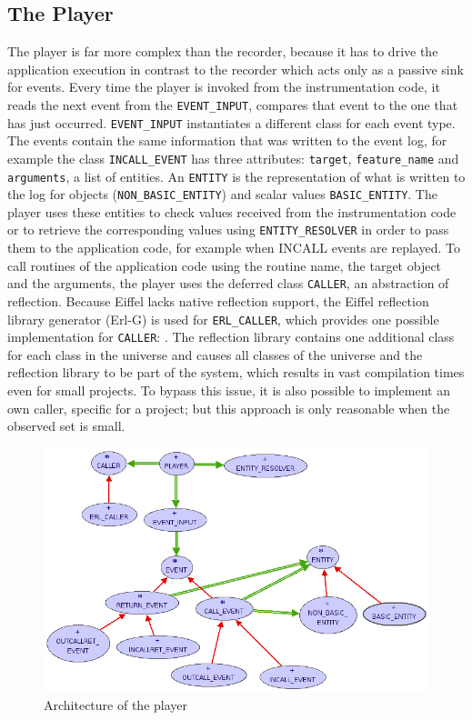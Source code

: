 \subsection{The Player}
The player is far more complex than the recorder, because it has to drive the application execution in contrast to the recorder which acts only as a passive sink for events. 
Every time the player is invoked from the instrumentation code, it reads the next event from the \texttt{EVENT\_INPUT}, compares that event to the one that has just occurred. \texttt{EVENT\_INPUT} instantiates a different class for each event type. The events contain the same information that was written to the event log, for example the class \texttt{INCALL\_EVENT} has three attributes: \texttt{target}, \texttt{feature\_name} and \texttt{arguments}, a list of entities. An \texttt{ENTITY} is the representation of what is written to the log for objects (\texttt{NON\_BASIC\_ENTITY}) and scalar values \texttt{BASIC\_ENTITY}. The player uses these entities to check values received from the instrumentation code or to retrieve the corresponding values using \texttt{ENTITY\_RESOLVER} in order to pass them to the application code, for example when INCALL events are replayed. To call routines of the application code using the routine name, the target object and the arguments, the player uses the deferred class \texttt{CALLER}, an abstraction of reflection. Because Eiffel lacks native reflection support, the Eiffel reflection library generator (Erl-G) \cite{erlg} is used for \texttt{ERL\_CALLER}, which provides one possible implementation for \texttt{CALLER}: . The reflection library contains one additional class for each class in the universe and causes all classes of the universe and the reflection library to be part of the system, which results in vast compilation times even for small projects. To bypass this issue, it is also possible to implement an own caller, specific for a project; but this approach is only reasonable when the observed set is small.

\begin{figure}[ht]
  \centering
  \includegraphics[width=1\textwidth]{illustrations/implementation_player.png}
  \caption{Architecture of the player}
  \label{fig:implementation_player}
\end{figure}

